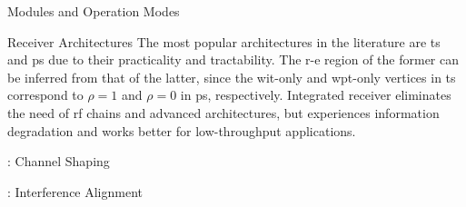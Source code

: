 \begin{section}{}
\begin{subsection}{Modules and Operation Modes}
\begin{subsubsection}{Receiver Architectures}
			The most popular architectures in the literature are \gls{ts} and \gls{ps} due to their practicality and tractability.
			The \gls{r-e} region of the former can be inferred from that of the latter, since the \gls{wit}-only and \gls{wpt}-only vertices in \gls{ts} correspond to $\rho=1$ and $\rho=0$ in \gls{ps}, respectively.
			Integrated receiver eliminates the need of \gls{rf} chains and advanced architectures, but experiences information degradation and works better for low-throughput applications.
		\end{subsubsection}
	\end{subsection}
\end{section}

\begin{section}{}
	\begin{subsection}{}

	\end{subsection}

	\begin{subsection}{}

	\end{subsection}

	\begin{subsection}{}

	\end{subsection}

	\begin{subsection}{}

	\end{subsection}
\end{section}



\begin{section}{}
	\begin{subsection}{: Channel Shaping}

	\end{subsection}

	\begin{subsection}{: Interference Alignment}

	\end{subsection}
\end{section}
